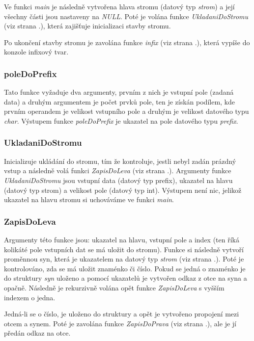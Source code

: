\documentclass[12pt,a4paper]{report}
\begin{document}
Ve funkci \textit{main} je následně vytvořena hlava stromu (datový typ \textit{strom}) a její všechny části jsou nastaveny na \textit{NULL}. Poté je volána funkce \textit{UkladaniDoStromu} (viz strana \pageref{UDS}.), která zajišťuje inicializaci stavby stromu.

Po ukončení stavby stromu je zavolána funkce \textit{infix} (viz strana \pageref{infix}.), která vypíše do konzole infixový tvar. 


\subsubsection{poleDoPrefix} \label{pDP}
Tato funkce vyžaduje dva argumenty, prvním z nich je vstupní pole (zadaná data) a druhým argumentem je počet prvků pole, ten je získán podílem, kde prvním operandem je velikost vstupního pole a druhým je velikost datového typu \textit{char}. Výstupem funkce \textit{poleDoPrefix} je ukazatel na  pole datového typu \textit{prefix}.

\subsubsection{UkladaniDoStromu} \label{UDS}
Inicializuje ukládání do stromu, tím že kontroluje, jestli nebyl zadán prázdný vstup a následně volá funkci \textit{ZapisDoLeva} (viz strana \pageref{ZDL}.). Argumenty funkce \textit{UkladaniDoStromu} jsou vstupní data (datový typ prefix), ukazatel na hlavu (datový typ strom) a velikost pole (datový typ int). Výstupem není nic, jelikož ukazatel na hlavu stromu si uchováváme ve funkci \textit{main}.

\subsubsection{ZapisDoLeva} \label{ZDL}
Argumenty této funkce jsou: ukazatel na hlavu, vstupní pole a index (ten říká kolikáté pole vstupních dat se má uložit do stromu). Funkce si následně vytvoří proměnnou syn, která je ukazatelem na datový typ \textit{strom} (viz strana \pageref{strom}.). Poté je kontrolováno, zda se má uložit znaménko či číslo. Pokud se jedná o znaménko je do struktury \textit{syn} uloženo a pomocí ukazatelů je vytvořen odkaz z otce na syna a opačně. Následně je rekurzivně volána opět funkce \textit{ZapisDoLeva} s vyšším indexem o jedna. 

Jedná-li se o číslo, je uloženo do struktury a opět je vytvořeno propojení mezi otcem a synem. Poté je zavolána funkce \textit{ZapisDoPrava} (viz strana \pageref{ZDP}.), ale je jí předán odkaz na otce. 
\end{document}
